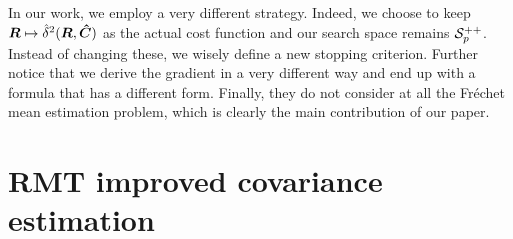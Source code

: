 \documentclass{article}
\theoremstyle{plain}
\theoremstyle{definition}
\theoremstyle{remark}
\begin{document}
In our work, we employ a very different strategy.
Indeed, we choose to keep $\boldsymbol{R}\mapsto\hat{\delta}^2(\boldsymbol{R},\boldsymbol{\hat{C}})$ as the actual cost function and our search space remains $\mathcal{S}^{++}_{p}$.
Instead of changing these, we wisely define a new stopping criterion.
%
Further notice that we derive the gradient in a very different way and end up with a formula that has a different form.
%
Finally, they do not consider at all the Fréchet mean estimation problem, which is clearly the main contribution of our paper.









\section{RMT improved covariance estimation}
\label{sec:cov}
\end{document}
